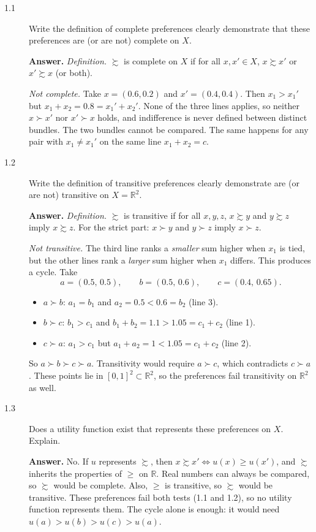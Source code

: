 \documentclass[11pt]{article}
\newenvironment{solution}{\par\smallskip\noindent\textbf{Answer.} }{\par\medskip}
\begin{document}
\begin{description}
\item[1.1] Write the definition of complete preferences clearly demonstrate that these preferences are (or are not) complete on $X$.
\begin{solution}
\emph{Definition.} $\succsim$ is complete on $X$ if for all $x,x'\in X$, $x\succsim x'$ or $x'\succsim x$ (or both).

\emph{Not complete.} Take $x=(0.6,0.2)$ and $x'=(0.4,0.4)$. Then $x_1>x_1'$ but $x_1+x_2=0.8=x_1'+x_2'$. None of the three lines applies, so neither $x\succ x'$ nor $x'\succ x$ holds, and indifference is never defined between distinct bundles. The two bundles cannot be compared. The same happens for any pair with $x_1\neq x_1'$ on the same line $x_1+x_2=c$.
\end{solution}

\item[1.2] Write the definition of transitive preferences clearly demonstrate are (or are not) transitive on $X=\mathbb{R}^2$.
\begin{solution}
\emph{Definition.} $\succsim$ is transitive if for all $x,y,z$, $x\succsim y$ and $y\succsim z$ imply $x\succsim z$. For the strict part: $x\succ y$ and $y\succ z$ imply $x\succ z$.

\emph{Not transitive.} The third line ranks a \emph{smaller} sum higher when $x_1$ is tied, but the other lines rank a \emph{larger} sum higher when $x_1$ differs. This produces a cycle. Take
\[
a=(0.5,\,0.5),\qquad b=(0.5,\,0.6),\qquad c=(0.4,\,0.65).
\]
\begin{itemize}[itemsep=0pt]
\item $a\succ b$: $a_1=b_1$ and $a_2=0.5<0.6=b_2$ (line 3).
\item $b\succ c$: $b_1>c_1$ and $b_1+b_2=1.1>1.05=c_1+c_2$ (line 1).
\item $c\succ a$: $a_1>c_1$ but $a_1+a_2=1<1.05=c_1+c_2$ (line 2).
\end{itemize}
So $a\succ b\succ c\succ a$. Transitivity would require $a\succ c$, which contradicts $c\succ a$. These points lie in $[0,1]^2\subset\mathbb{R}^2$, so the preferences fail transitivity on $\mathbb{R}^2$ as well.
\end{solution}

\item[1.3] Does a utility function exist that represents these preferences on $X$. Explain.
\begin{solution}
No. If $u$ represents $\succsim$, then $x\succsim x'\iff u(x)\ge u(x')$, and $\succsim$ inherits the properties of $\ge$ on $\mathbb{R}$. Real numbers can always be compared, so $\succsim$ would be complete. Also, $\ge$ is transitive, so $\succsim$ would be transitive. These preferences fail both tests (1.1 and 1.2), so no utility function represents them. The cycle alone is enough: it would need $u(a)>u(b)>u(c)>u(a)$.
\end{solution}
\end{description}
\end{document}
